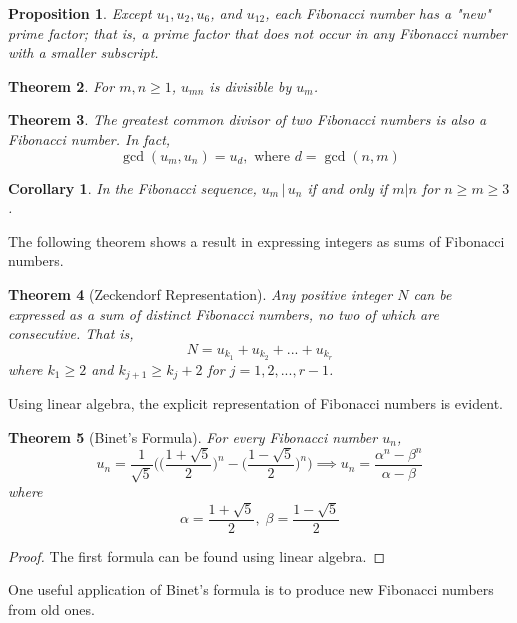 \documentclass{article}
\newtheorem{theorem}{Theorem}[section]
\newtheorem{proposition}[theorem]{Proposition}
\newtheorem{corollary}{Corollary}[theorem]
\theoremstyle{remark}
\theoremstyle{definition}
\begin{document}
\begin{proposition}
Except $u_1, u_2, u_6$, and $u_{12}$, each Fibonacci number has a "new" prime factor; that is, a prime factor that does not occur in any Fibonacci number with a smaller subscript. 
\end{proposition}

\begin{theorem}
For $m, n \geq 1$, $u_{mn}$ is divisible by $u_m$. 
\end{theorem}

\begin{theorem}
The greatest common divisor of two Fibonacci numbers is also a Fibonacci number. In fact, 
\[\gcd(u_m, u_n) = u_d, \text{ where } d = \gcd(n, m)\]
\end{theorem}


\begin{corollary}
In the Fibonacci sequence, $u_m \,|\, u_n$ if and only if $m|n$ for $n \geq m \geq 3$. 
\end{corollary}

The following theorem shows a result in expressing integers as sums of Fibonacci numbers. 

\begin{theorem}[Zeckendorf Representation]
Any positive integer $N$ can be expressed as a sum of distinct Fibonacci numbers, no two of which are consecutive. That is, 
\[N = u_{k_1} + u_{k_2} + ... + u_{k_r}\]
where $k_1 \geq 2$ and $k_{j+1} \geq k_j + 2$ for $j = 1, 2, ..., r-1$. 
\end{theorem}

Using linear algebra, the explicit representation of Fibonacci numbers is evident. 

\begin{theorem}[Binet's Formula]
For every Fibonacci number $u_n$, 
\[u_n = \frac{1}{\sqrt{5}} \Bigg( \bigg(\frac{1 + \sqrt{5}}{2} \bigg)^n - \bigg( \frac{1-\sqrt{5}}{2} \bigg)^n \Bigg) \implies u_n = \frac{\alpha^n - \beta^n}{\alpha - \beta}\]
where
\[\alpha = \frac{1 + \sqrt{5}}{2}, \; \beta = \frac{1-\sqrt{5}}{2}\]
\end{theorem}
\begin{proof}
The first formula can be found using linear algebra. 
\end{proof}

One useful application of Binet's formula is to produce new Fibonacci numbers from old ones. 
\end{document}
